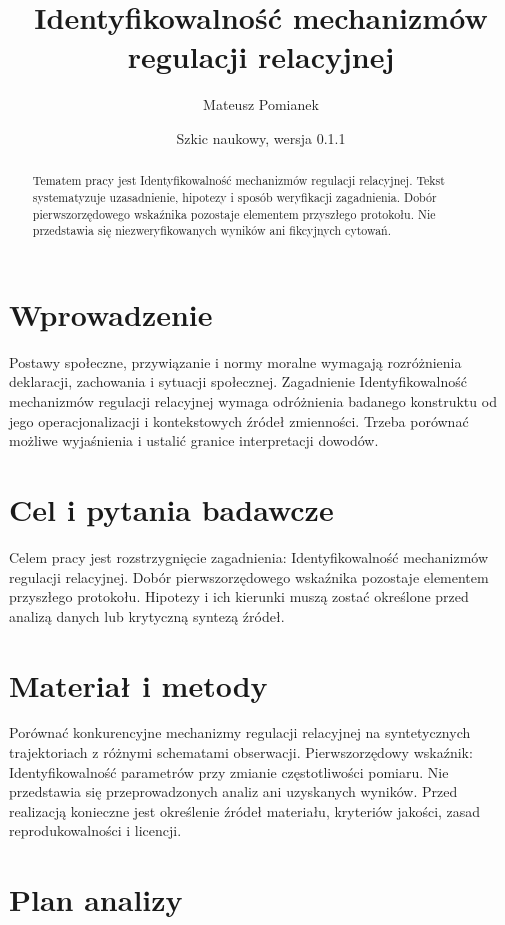 \documentclass[11pt,a4paper]{article}
\title{Identyfikowalność mechanizmów regulacji relacyjnej}
\author{Mateusz Pomianek}
\date{Szkic naukowy, wersja 0.1.1}
\begin{document}
\maketitle

\begin{abstract}

Tematem pracy jest Identyfikowalność mechanizmów regulacji relacyjnej. Tekst systematyzuje uzasadnienie, hipotezy i sposób weryfikacji zagadnienia. Dobór pierwszorzędowego wskaźnika pozostaje elementem przyszłego protokołu. Nie przedstawia się niezweryfikowanych wyników ani fikcyjnych cytowań.

\end{abstract}

\section{Wprowadzenie}

Postawy społeczne, przywiązanie i normy moralne wymagają rozróżnienia deklaracji, zachowania i sytuacji społecznej. Zagadnienie Identyfikowalność mechanizmów regulacji relacyjnej wymaga odróżnienia badanego konstruktu od jego operacjonalizacji i kontekstowych źródeł zmienności. Trzeba porównać możliwe wyjaśnienia i ustalić granice interpretacji dowodów.

\section{Cel i pytania badawcze}

Celem pracy jest rozstrzygnięcie zagadnienia: Identyfikowalność mechanizmów regulacji relacyjnej. Dobór pierwszorzędowego wskaźnika pozostaje elementem przyszłego protokołu. Hipotezy i ich kierunki muszą zostać określone przed analizą danych lub krytyczną syntezą źródeł.

\section{Materiał i metody}

Porównać konkurencyjne mechanizmy regulacji relacyjnej na syntetycznych trajektoriach z różnymi schematami obserwacji. Pierwszorzędowy wskaźnik: Identyfikowalność parametrów przy zmianie częstotliwości pomiaru. Nie przedstawia się przeprowadzonych analiz ani uzyskanych wyników. Przed realizacją konieczne jest określenie źródeł materiału, kryteriów jakości, zasad reprodukowalności i licencji.

\section{Plan analizy}
\end{document}
